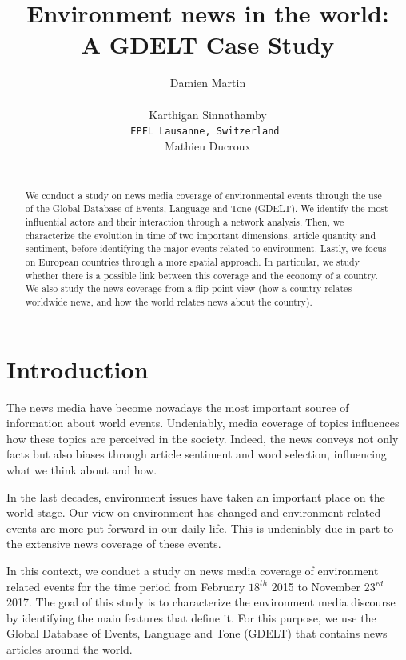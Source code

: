\documentclass[11pt]{article}
\title{Environment news in the world: \\ A GDELT Case Study}
\author{Damien Martin \\
  {\tt } \\\And
  Karthigan Sinnathamby \\
  {\tt EPFL Lausanne, Switzerland } \\\And
Mathieu Ducroux \\
{\tt } \\}
\date{}
\begin{document}
\maketitle

\begin{abstract}
   We conduct a study on news media coverage of environmental events through the use of the Global Database of Events, Language and Tone (GDELT). We identify the most influential actors and their interaction through a network analysis. Then, we characterize the evolution in time of two important dimensions, article quantity and sentiment, before identifying the major events related to environment. Lastly, we focus on European countries through a more spatial approach. In particular, we study whether there is a possible link between this coverage and the economy of a country. We also study the news coverage from a flip point view (how a country relates worldwide news, and how the world relates news about the country).

\end{abstract}

\section{Introduction}
The news media have become nowadays the most important source of information about world events. Undeniably, media coverage of topics influences how these topics are perceived in the society. Indeed, the news conveys not only facts but also biases through article sentiment and word selection, influencing what we think about and how.

In the last decades, environment issues have taken an important place on the world stage. Our view on environment has changed and environment related events are more put forward in our daily life. This is undeniably due in part to the extensive news coverage of these events.

In this context, we conduct a study on news media coverage of environment related events for the time period from February $18^{th}$ 2015 to November 23$^{rd}$ 2017. The goal of this study is to characterize the environment media discourse by identifying the main features that define it. For this purpose, we use the Global Database of Events, Language and Tone (GDELT) that contains news articles around the world. 
\end{document}
